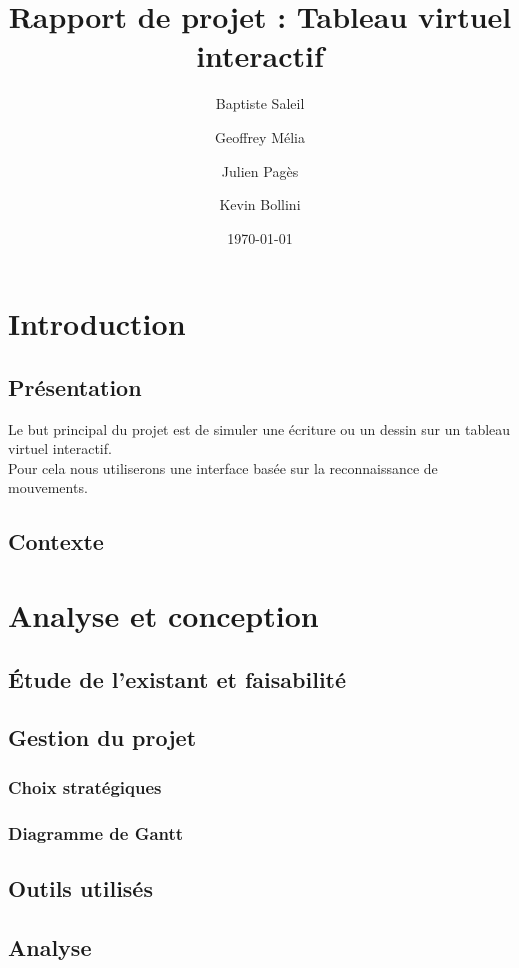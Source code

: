 \documentclass{report}
\title{Rapport de projet : Tableau virtuel interactif}
\author{Baptiste Saleil \and Geoffrey Mélia \and Julien Pagès \and Kevin Bollini}
\date{\today}
\begin{document}
	\maketitle
	\thispagestyle{empty}
	\newpage
	
	\tableofcontents

	\listoffigures
	
	\newpage
	\chapter{Introduction}
		\section{Présentation}
		Le but principal du projet est de simuler une écriture ou un dessin sur un tableau virtuel interactif. \\
		Pour cela nous utiliserons une interface basée sur la reconnaissance de mouvements.
		
		\section{Contexte}
	
	\chapter{Analyse et conception}
		\section{Étude de l'existant et faisabilité}
		\section{Gestion du projet}
			\subsection{Choix stratégiques}
			\subsection{Diagramme de Gantt}
		\section{Outils utilisés}
		\section{Analyse}
\end{document}
